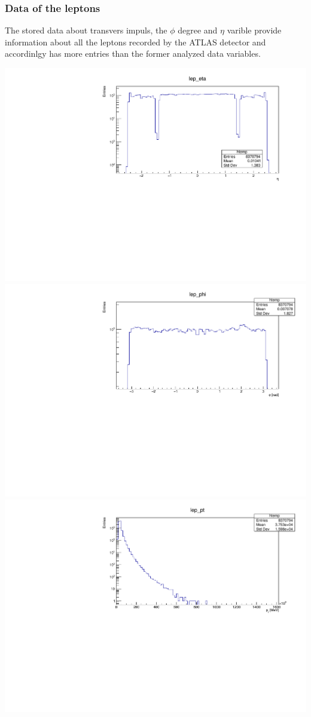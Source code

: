 \documentclass[12pt, a4paper, bibliography=totoc]{scrartcl}
\begin{document}
\begin{multicols}{2}
\subsubsection{Data of the leptons}
The stored data about transvers impuls, the $\phi$ degree and $\eta$ varible provide information about all the leptons recorded by the ATLAS detector and accordinlgy has more entries than the former analyzed data variables.
\begin{center}
    \includegraphics[width=\linewidth]{fig/lep_eta_redo.pdf}
    \includegraphics[width=\linewidth]{fig/lep_phi_redo.pdf}
    \includegraphics[width=\linewidth]{fig/lep_pt_redo.pdf}

\end{center}
\end{multicols}
\end{document}
